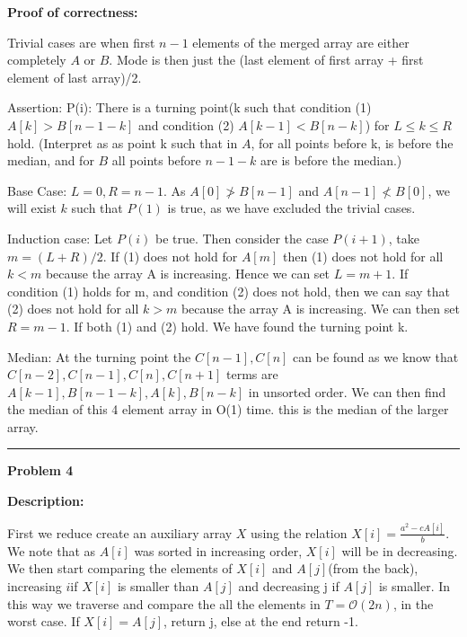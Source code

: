 \documentclass[10pt, a4paper]{article}
\newcommand{\BigO}{\mathcal{O}}
\begin{document}
\vspace{10px}
\noindent\textbf{Proof of correctness:}

Trivial cases are when first $n-1$ elements of the merged array are either completely $A$ or $B$. Mode is then just the (last element of first array + first element of last array)/2.

Assertion: P(i): There is a turning point(k such that condition (1) $A[k] > B[n-1-k]$ and condition (2) $A[k-1] < B[n-k]$) for $ L \leq k \leq R$ hold. (Interpret as as point k such that in $A$, for all points before k, is before the median, and for $B$ all points before $n-1-k$ are is before the median.)

Base Case: $L = 0,R=n-1$. As $A[0] \ngtr B[n-1]$ and $A[n-1] \nless B[0]$, we will exist $k$ such that $P(1)$ is true, as we have excluded the trivial cases.

Induction case: Let $P(i)$ be true. Then consider the case $P(i+1)$, take $m = (L+R)/2$. If (1) does not hold for $A[m]$ then (1) does not hold for all $k<m$ because the array A is increasing. Hence we can set $L = m+1$. If condition (1) holds for m, and condition (2) does not hold, then we can say that (2) does not hold for all $k>m$ because the array A is increasing. We can then set $R = m-1$. If both (1) and (2) hold. We have found the turning point k.

Median: At the turning point the $C[n-1], C[n]$ can be found as we know that $C[n-2], C[n-1], C[n], C[n+1]$ terms are $A[k-1], B[n-1-k], A[k], B[n-k]$ in unsorted order. We can then find the median of this 4 element array in O(1) time. this is the median of the larger array.

\noindent\rule{\textwidth}{1px}
\noindent\large{\textbf{Problem 4}}
\vspace{5pt}
\normalsize

\vspace{10px}
\noindent\textbf{Description:}

\noindent First we reduce create an auxiliary array $X$ using the relation $X[i] = \frac{a^2-cA[i]}{b}$. We note that as $A[i]$ was sorted in increasing order, $X[i]$ will be in decreasing. We then start comparing the elements of $X[i]$ and $A[j]$(from the back), increasing $i$if $X[i]$ is smaller than $A[j]$ and decreasing j if $A[j]$ is smaller. In this way we traverse and compare the all the elements in $T=\BigO(2n)$, in the worst case. If $X[i] = A[j]$, return j, else at the end return -1.
\end{document}
